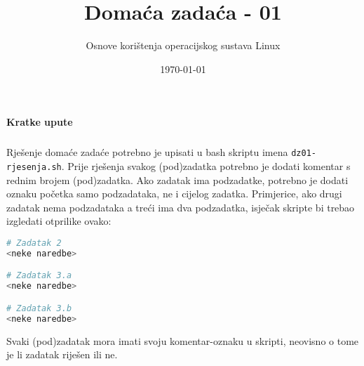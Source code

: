 \documentclass{exam}
\author{Osnove korištenja operacijskog sustava Linux}
\date{\today}
\newcommand{\shell}[1]{\texttt{#1}}
\begin{document}
\title{Domaća zadaća - 01}
\maketitle

\paragraph{Kratke upute}
\subparagraph{}
Rješenje domaće zadaće potrebno je upisati u bash skriptu imena \shell{dz01-rjesenja.sh}. Prije rješenja svakog (pod)zadatka potrebno je dodati komentar s rednim brojem (pod)zadatka. Ako zadatak ima podzadatke, potrebno je dodati oznaku početka samo podzadataka, ne i cijelog zadatka. Primjerice, ako drugi zadatak nema podzadataka a treći ima dva podzadatka, isječak skripte bi trebao izgledati otprilike ovako:
\begin{lstlisting}[language=bash]
# Zadatak 2
<neke naredbe>

# Zadatak 3.a
<neke naredbe>

# Zadatak 3.b
<neke naredbe>
\end{lstlisting}

Svaki (pod)zadatak mora imati svoju komentar-oznaku u skripti, neovisno o tome je li zadatak riješen ili ne.
\end{document}

